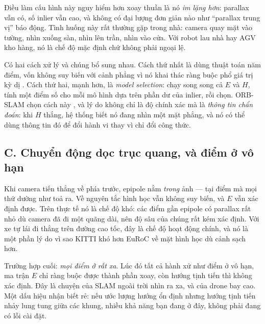 \documentclass[../../vslam.tex]{subfiles}
\begin{document}
Điều làm cấu hình này nguy hiểm hơn xoay thuần là nó \emph{im lặng hơn}: parallax vẫn có, số inlier vẫn cao, và không có đại lượng đơn giản nào như ``parallax trung vị'' báo động. Tình huống này rất thường gặp trong nhà: camera quay mặt vào tường, nhìn xuống sàn, nhìn lên trần, nhìn vào cửa. Với robot lau nhà hay AGV kho hàng, nó là chế độ mặc định chứ không phải ngoại lệ.

Có hai cách xử lý và chúng bổ sung nhau. Cách thứ nhất là dùng thuật toán năm điểm, vốn không suy biến với cảnh phẳng vì nó khai thác ràng buộc phổ giá trị kỳ dị \cite{nister2004fivepoint}. Cách thứ hai, mạnh hơn, là \emph{model selection}: chạy song song cả \(E\) và \(H\), tính một điểm số cho mỗi mô hình dựa trên phần dư của inlier, rồi chọn. ORB-SLAM chọn cách này \cite{murartal2015orbslam}, và lý do không chỉ là độ chính xác mà là \emph{thông tin chẩn đoán}: khi \(H\) thắng, hệ thống biết nó đang nhìn một mặt phẳng, và nó có thể dùng thông tin đó để đổi hành vi thay vì chỉ đổi công thức.

\subsection{C. Chuyển động dọc trục quang, và điểm ở vô hạn}

Khi camera tiến thẳng về phía trước, epipole nằm \emph{trong} ảnh --- tại điểm mà mọi thứ dường như toả ra. Về nguyên tắc hình học vẫn không suy biến, và \(E\) vẫn xác định được. Trên thực tế nó là chế độ khó: các điểm gần epipole có parallax rất nhỏ dù camera đã đi một quãng dài, nên độ sâu của chúng rất kém xác định. Với xe tự lái đi thẳng trên đường cao tốc, đây là chế độ hoạt động chính, và nó là một phần lý do vì sao KITTI khó hơn EuRoC về mặt hình học dù cảnh sạch hơn.

Trường hợp cuối: \emph{mọi điểm ở rất xa}. Lúc đó tất cả hành xử như điểm ở vô hạn, ma trận \(E\) chỉ ràng buộc được thành phần xoay, còn hướng tịnh tiến thì không xác định. Đây là chuyện của SLAM ngoài trời nhìn ra xa, và của drone bay cao. Một dấu hiệu nhận biết rẻ: nếu ước lượng hướng ổn định nhưng hướng tịnh tiến nhảy lung tung giữa các khung, nhiều khả năng bạn đang ở đây, không phải đang có lỗi cài đặt.
\end{document}

